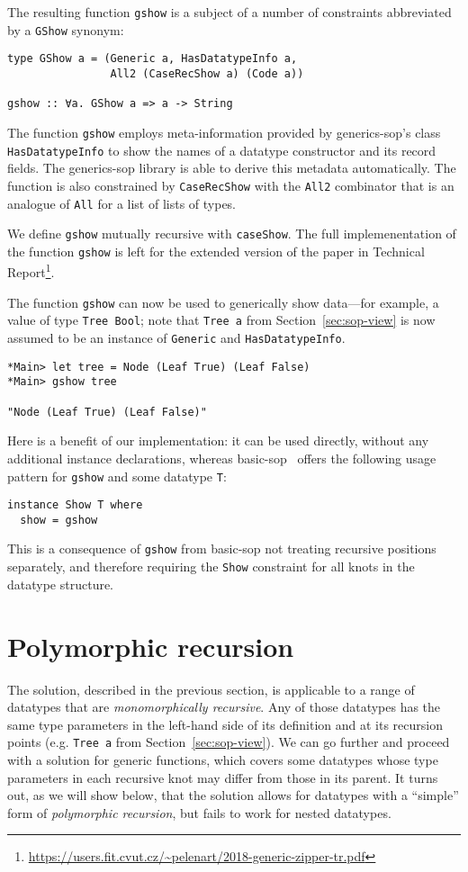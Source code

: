 \documentclass[runningheads]{llncs}
\newcommand{\K}[1]{\lstinline{#1}}
\begin{document}
The resulting function \K{gshow} is a subject of a number of constraints abbreviated by a \K{GShow} synonym:
\begin{lstlisting}
type GShow a = (Generic a, HasDatatypeInfo a,
                All2 (CaseRecShow a) (Code a))

gshow :: ∀a. GShow a => a -> String
\end{lstlisting}
The function \K{gshow} employs meta-information provided by \textsf{generics-sop}'s class \K{HasDatatypeInfo} to show the names of a datatype constructor and its record fields. The \textsf{generics-sop} library is able to derive this metadata automatically.
The function is also constrained by \K{CaseRecShow} with the \K{All2} combinator that is an analogue of \K{All} for a list of lists of types. 

We define \K{gshow} mutually recursive with \K{caseShow}. The full implemenentation of the function \K{gshow} is left for the extended version of the paper in Technical Report\footnote{\url{https://users.fit.cvut.cz/~pelenart/2018-generic-zipper-tr.pdf}}.

The function \K{gshow} can now be used to generically show data---for example, a value of type \K{Tree Bool}; note that \K{Tree a} from Section~\ref{sec:sop-view} is now assumed to be an instance of \K{Generic} and \K{HasDatatypeInfo}.
\begin{lstlisting}
*Main> let tree = Node (Leaf True) (Leaf False)
*Main> gshow tree

"Node (Leaf True) (Leaf False)"
\end{lstlisting}
Here is a benefit of our implementation: it can be used directly, without any additional instance declarations, whereas \textsf{basic-sop}~\cite{basic-sop} offers the following usage pattern for \K{gshow} and some datatype \K{T}:
\begin{lstlisting}
instance Show T where
  show = gshow
\end{lstlisting}
This is a consequence of \K{gshow} from \textsf{basic-sop} not treating recursive positions separately, and therefore requiring the \K{Show} constraint for all knots in the datatype structure.

\section{Polymorphic recursion}
\label{sec:polymorphic-recursion}

The solution, described in the previous section, is applicable to a range of datatypes that are \emph{monomorphically recursive}. Any of those datatypes has the same type parameters in the left-hand side of its definition and at its recursion points (e.g. \K{Tree a} from Section~\ref{sec:sop-view}). We can go further and proceed with a solution for generic functions, which covers some datatypes whose type parameters in each recursive knot may differ from those in its parent. It turns out, as we will show below, that the solution allows for datatypes with a ``simple'' form of \emph{polymorphic recursion}, but fails to work for nested datatypes.
\end{document}
